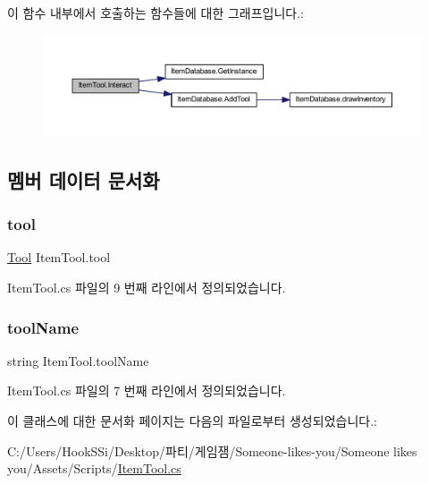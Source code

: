 \begin{DoxyCode}{0}

\end{DoxyCode}
이 함수 내부에서 호출하는 함수들에 대한 그래프입니다.\+:\nopagebreak
\begin{figure}[H]
\begin{center}
\leavevmode
\includegraphics[width=350pt]{d3/df3/class_item_tool_aaf220012be263b22a8834bf48d6a032c_cgraph}
\end{center}
\end{figure}


\subsection{멤버 데이터 문서화}
\mbox{\label{class_item_tool_a9b51d0f3ce1a0b527ff241eaf4a042e4}} 
\subsubsection{\texorpdfstring{tool}{tool}}
{\footnotesize\ttfamily \mbox{\hyperlink{class_tool}{Tool}} Item\+Tool.\+tool}



Item\+Tool.\+cs 파일의 9 번째 라인에서 정의되었습니다.

\mbox{\label{class_item_tool_ae77e5af9e242f4ebbc1d27db2fd764d7}} 
\subsubsection{\texorpdfstring{toolName}{toolName}}
{\footnotesize\ttfamily string Item\+Tool.\+tool\+Name}



Item\+Tool.\+cs 파일의 7 번째 라인에서 정의되었습니다.



이 클래스에 대한 문서화 페이지는 다음의 파일로부터 생성되었습니다.\+:\begin{DoxyCompactItemize}
\item 
C\+:/\+Users/\+Hook\+S\+Si/\+Desktop/파티/게임잼/\+Someone-\/likes-\/you/\+Someone likes you/\+Assets/\+Scripts/\mbox{\hyperlink{_item_tool_8cs}{Item\+Tool.\+cs}}\end{DoxyCompactItemize}
